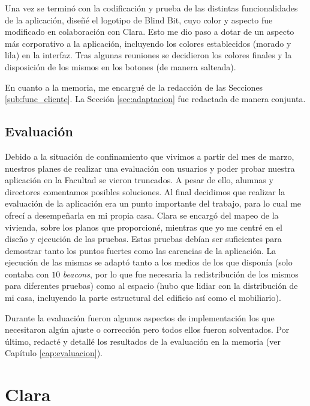 Una vez se terminó con la codificación y prueba de las distintas funcionalidades de la aplicación, diseñé el logotipo de Blind Bit, cuyo color y aspecto fue modificado en colaboración con Clara. Esto me dio paso a dotar de un aspecto más corporativo a la aplicación, incluyendo los colores establecidos (morado y lila) en la interfaz. Tras algunas reuniones se decidieron los colores finales y la disposición de los mismos en los botones (de manera salteada).

En cuanto a la memoria, me encargué de la redacción de las Secciones \ref{sub:func_cliente}. La Sección \ref{sec:adaptacion} fue redactada de manera conjunta.

\subsection{Evaluación}

Debido a la situación de confinamiento que vivimos a partir del mes de marzo, nuestros planes de realizar una evaluación con usuarios y poder probar nuestra aplicación en la Facultad se vieron truncados. A pesar de ello, alumnas y directores comentamos posibles soluciones. Al final decidimos que realizar la evaluación de la aplicación era un punto importante del trabajo, para lo cual me ofrecí a desempeñarla en mi propia casa. Clara se encargó del mapeo de la vivienda, sobre los planos que proporcioné, mientras que yo me centré en el diseño y ejecución de las pruebas. Estas pruebas debían ser suficientes para demostrar tanto los puntos fuertes como las carencias de la aplicación. La ejecución de las mismas se adaptó tanto a los medios de los que disponía (solo contaba con $10$ \textit{beacons}, por lo que fue necesaria la redistribución de los mismos para diferentes pruebas) como al espacio (hubo que lidiar con la distribución de mi casa, incluyendo la parte estructural del edificio así como el mobiliario).

Durante la evaluación fueron algunos aspectos de implementación los que necesitaron algún ajuste o corrección pero todos ellos fueron solventados. Por último, redacté y detallé los resultados de la evaluación en la memoria (ver Capítulo \ref{cap:evaluacion}).

\section{Clara}
\label{sec:trabajoClara}